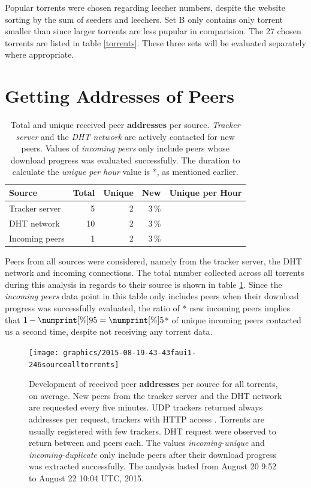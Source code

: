 \documentclass[10pt, a4paper, twoside, headsepline]{scrbook}
\renewcommand{\_}{\origunderscore\allowbreak}
\newcommand{\range}{from August 20 9:52 to August 22 10:04 UTC, 2015} %
\begin{document}
Popular torrents were chosen regarding leecher numbers, despite the website sorting by the sum of seeders and leechers. Set B only contains only torrent smaller than  since larger torrents are less pupular in comparision. The 27 chosen torrents are listed in table \ref{torrents}. These three sets will be evaluated separately where appropriate.

\section{Getting Addresses of Peers}
\begin{table}
\centering
\begin{tabular}{lrrrr}
\toprule
Source & Total & Unique & New & Unique per Hour \\
\midrule
Tracker server & 5 & 2 & 3\,\% \\
DHT network & 10 & 2 & 3\,\% \\
Incoming peers & 1 & 2 & 3\,\% \\
\bottomrule
\end{tabular}
\caption[Received peer addresses per source]{Total and unique received peer \textbf{addresses} per source. \emph{Tracker server} and the \emph{DHT network} are actively contacted for new peers. Values of \emph{incoming peers} only include peers whose download progress was evaluated successfully. The duration to calculate the \emph{unique per hour} value is *, as mentioned earlier.}
\label{unique-peers}
\end{table}

Peers from all sources were considered, namely from the tracker server, the DHT network and incoming connections. The total number collected across all torrents during this analysis in regards to their source is shown in table \ref{unique-peers}. Since the \emph{incoming peers} data point in this table only includes peers when their download progress was successfully evaluated, the ratio of * new incoming peers implies that $1-\numprint[\%]{95}=\numprint[\%]{5}$* of unique incoming peers contacted us a second time, despite not receiving any torrent data.

\begin{figure}
\centering
\texttt{[image: graphics/2015-08-19\_20-43-43\_faui1-246\_source\_all\_torrents]}
\caption[Development of received peer addresses per source]{Development of received peer \textbf{addresses} per source for all torrents, on average. New peers from the tracker server and the DHT network are requested every five minutes. UDP trackers returned always  addresses per request, trackers with HTTP access . Torrents are usually registered with few trackers. DHT request were observed to return between  and  peers each. The values \emph{incoming-unique} and \emph{incoming-duplicate} only include peers after their download progress was extracted successfully. The analysis lasted \range.}
\label{request-history}
\end{figure}
\end{document}
